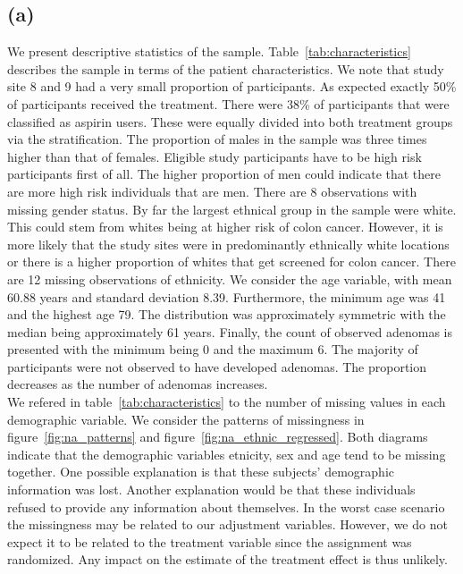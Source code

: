 \documentclass[paper=a4, fontsize=11pt]{scrartcl} %
\numberwithin{equation}{section} %
\numberwithin{figure}{section} %
\numberwithin{table}{section} %
\begin{document}
\subsection{(a)}
\label{sec:results_a}
We present descriptive statistics of the sample. Table~\ref{tab:characteristics} describes the sample in terms of the patient characteristics. We note that study site 8 and 9 had a very small proportion of participants. As expected exactly 50\% of participants received the treatment. There were 38\% of participants that were classified as aspirin users. These were equally divided into both treatment groups via the stratification. The proportion of males in the sample was three times higher than that of females. Eligible study participants have to be high risk participants first of all. The higher proportion of men could indicate that there are more high risk individuals that are men. There are 8 observations with missing gender status. By far the largest ethnical group in the sample were white. This could stem from whites being at higher risk of colon cancer. However, it is more likely that the study sites were in predominantly ethnically white locations or there is a higher proportion of whites that get screened for colon cancer. There are 12 missing observations of ethnicity. We consider the age variable, with mean 60.88 years and standard deviation 8.39. Furthermore, the minimum age was 41 and the highest age 79. The distribution was approximately symmetric with the median being approximately 61 years.
Finally, the count of observed adenomas is presented with the minimum being 0 and the maximum 6. The majority of participants were not observed to have developed adenomas. The proportion decreases as the number of adenomas increases.\\

We refered in table~\ref{tab:characteristics} to the number of missing values in each demographic variable. We consider the patterns of missingness in figure~\ref{fig:na_patterns} and figure~\ref{fig:na_ethnic_regressed}. Both diagrams indicate that the demographic variables etnicity, sex and age tend to be missing together. One possible explanation is that these subjects' demographic information was lost. Another explanation would be that these individuals refused to provide any information about themselves. In the worst case scenario the missingness may be related to our adjustment variables. However, we do not expect it to be related to the treatment variable since the assignment was randomized. Any impact on the estimate of the treatment effect is thus unlikely.\\
\end{document}
